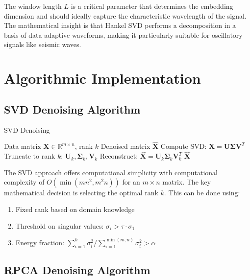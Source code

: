 \documentclass[10pt,twocolumn]{article}
\begin{document}
The window length $L$ is a critical parameter that determines the embedding dimension and should ideally capture the characteristic wavelength of the signal. The mathematical insight is that Hankel SVD performs a decomposition in a basis of data-adaptive waveforms, making it particularly suitable for oscillatory signals like seismic waves.

\section{Algorithmic Implementation}
\subsection{SVD Denoising Algorithm}

\begin{algorithm}
\caption{SVD Denoising}
\begin{algorithmic}[1]
\REQUIRE Data matrix $\mathbf{X} \in \mathbb{R}^{m \times n}$, rank $k$
\ENSURE Denoised matrix $\mathbf{\hat{X}}$
\STATE Compute SVD: $\mathbf{X} = \mathbf{U} \mathbf{\Sigma} \mathbf{V}^T$
\STATE Truncate to rank $k$: $\mathbf{U}_k, \mathbf{\Sigma}_k, \mathbf{V}_k$
\STATE Reconstruct: $\mathbf{\hat{X}} = \mathbf{U}_k \mathbf{\Sigma}_k \mathbf{V}_k^T$
\RETURN $\mathbf{\hat{X}}$
\end{algorithmic}
\end{algorithm}

The SVD approach offers computational simplicity with computational complexity of $O(\min(mn^2, m^2n))$ for an $m \times n$ matrix. The key mathematical decision is selecting the optimal rank $k$. This can be done using:

\begin{enumerate}
\item Fixed rank based on domain knowledge
\item Threshold on singular values: $\sigma_i > \tau \cdot \sigma_1$
\item Energy fraction: $\sum_{i=1}^{k} \sigma_i^2 / \sum_{i=1}^{\min(m,n)} \sigma_i^2 > \alpha$
\end{enumerate}

\subsection{RPCA Denoising Algorithm}
\end{document}
